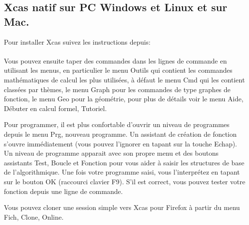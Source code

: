 \documentclass[12pt,a4paper]{book}
\begin{document}
\begin{giacjshere}
\subsection{Xcas natif sur PC Windows et Linux et sur Mac.}
Pour installer Xcas suivez les instructions depuis:\\
\\

Vous pouvez ensuite taper des commandes dans les lignes de commande
en utilisant les menus, en particulier le menu Outils qui contient
les commandes math\'ematiques de calcul les plus utilis\'ees, \`a d\'efaut
le menu Cmd qui les contient class\'ees par th\`emes, le menu Graph pour
les commandes de type graphes de fonction, le menu Geo pour la g\'eom\'etrie,
pour plus de d\'etails voir le menu Aide, D\'ebuter en calcul formel, Tutoriel.

Pour programmer, il est plus confortable d'ouvrir un niveau de programmes
depuis le menu Prg, nouveau programme. Un assistant de cr\'eation de
fonction s'ouvre imm\'ediatement (vous pouvez l'ignorer en tapant sur
la touche Echap). Un niveau de programme apparait avec son propre menu
et des boutons assistants Test, Boucle et Fonction pour vous aider
\`a saisir les structures de base de l'algorithmique. Une fois
votre programme saisi, vous l'interpr\'etez en tapant sur le bouton
OK (raccourci clavier F9). S'il est correct, vous pouvez tester votre
fonction depuis une ligne de commande.

Vous pouvez cloner une session simple vers Xcas pour Firefox \`a
partir du menu Fich, Clone, Online.


\end{giacjshere}
\end{document}
